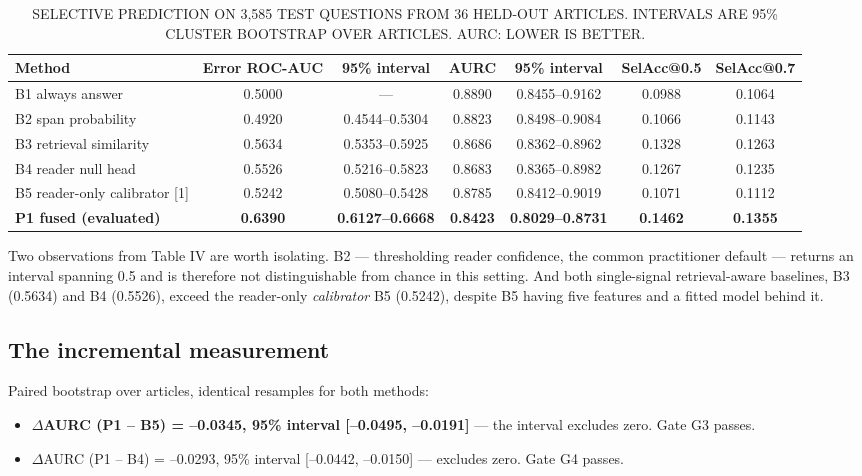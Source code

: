 \documentclass[conference]{IEEEtran}
\begin{document}
\begin{table}[t]\centering\caption{SELECTIVE PREDICTION ON 3,585 TEST QUESTIONS FROM 36 HELD-OUT ARTICLES. INTERVALS ARE 95\% CLUSTER BOOTSTRAP OVER ARTICLES. AURC: LOWER IS BETTER.}\label{tab:4}\footnotesize
\begin{tabular}{lcccccc}\hline
\textbf{Method} & \textbf{Error ROC-AUC} & \textbf{95\% interval} & \textbf{AURC} & \textbf{95\% interval} & \textbf{SelAcc@0.5} & \textbf{SelAcc@0.7} \\ \hline
B1 always answer & 0.5000 & --- & 0.8890 & 0.8455--0.9162 & 0.0988 & 0.1064 \\
B2 span probability & 0.4920 & 0.4544--0.5304 & 0.8823 & 0.8498--0.9084 & 0.1066 & 0.1143 \\
B3 retrieval similarity & 0.5634 & 0.5353--0.5925 & 0.8686 & 0.8362--0.8962 & 0.1328 & 0.1263 \\
B4 reader null head & 0.5526 & 0.5216--0.5823 & 0.8683 & 0.8365--0.8982 & 0.1267 & 0.1235 \\
B5 reader-only calibrator [1] & 0.5242 & 0.5080--0.5428 & 0.8785 & 0.8412--0.9019 & 0.1071 & 0.1112 \\
\textbf{P1 fused (evaluated)} & \textbf{0.6390} & \textbf{0.6127--0.6668} & \textbf{0.8423} & \textbf{0.8029--0.8731} & \textbf{0.1462} & \textbf{0.1355} \\
\hline\end{tabular}\end{table}

Two observations from Table IV are worth isolating. B2 --- thresholding reader confidence, the common practitioner default --- returns an interval spanning 0.5 and is therefore not distinguishable from chance in this setting. And both single-signal retrieval-aware baselines, B3 (0.5634) and B4 (0.5526), exceed the reader-only \emph{calibrator} B5 (0.5242), despite B5 having five features and a fitted model behind it.

\subsection{The incremental measurement}

Paired bootstrap over articles, identical resamples for both methods:

\begin{itemize}\itemsep0pt
\item \textbf{$\Delta$AURC (P1 -- B5) = --0.0345, 95\% interval [--0.0495, --0.0191]} --- the interval excludes zero. Gate G3 passes.
\item $\Delta$AURC (P1 -- B4) = --0.0293, 95\% interval [--0.0442, --0.0150] --- excludes zero. Gate G4 passes.
\end{itemize}
\end{document}
